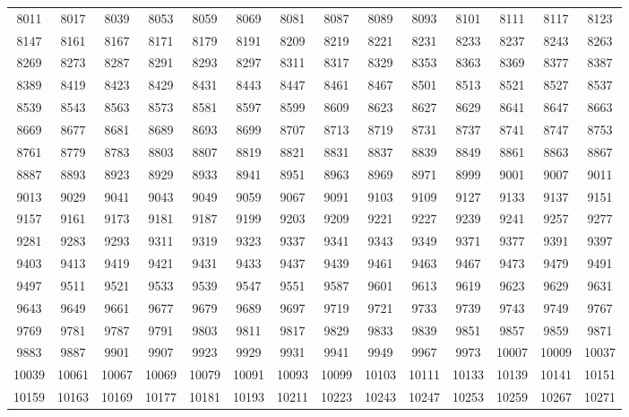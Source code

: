 \documentclass[10pt, a4paper]{article}
\begin{document}
\begin{center}
\begin{longtable}{c c c c c c c c c c c c c c}
        8011 & 8017 & 8039 & 8053 & 8059 & 8069 & 8081 & 8087 & 8089 & 8093 & 8101 & 8111 & 8117 & 8123 \\
        8147 & 8161 & 8167 & 8171 & 8179 & 8191 & 8209 & 8219 & 8221 & 8231 & 8233 & 8237 & 8243 & 8263 \\
        8269 & 8273 & 8287 & 8291 & 8293 & 8297 & 8311 & 8317 & 8329 & 8353 & 8363 & 8369 & 8377 & 8387 \\
        8389 & 8419 & 8423 & 8429 & 8431 & 8443 & 8447 & 8461 & 8467 & 8501 & 8513 & 8521 & 8527 & 8537 \\
        8539 & 8543 & 8563 & 8573 & 8581 & 8597 & 8599 & 8609 & 8623 & 8627 & 8629 & 8641 & 8647 & 8663 \\
        8669 & 8677 & 8681 & 8689 & 8693 & 8699 & 8707 & 8713 & 8719 & 8731 & 8737 & 8741 & 8747 & 8753 \\
        8761 & 8779 & 8783 & 8803 & 8807 & 8819 & 8821 & 8831 & 8837 & 8839 & 8849 & 8861 & 8863 & 8867 \\
        8887 & 8893 & 8923 & 8929 & 8933 & 8941 & 8951 & 8963 & 8969 & 8971 & 8999 & 9001 & 9007 & 9011 \\
        \hline
        9013 & 9029 & 9041 & 9043 & 9049 & 9059 & 9067 & 9091 & 9103 & 9109 & 9127 & 9133 & 9137 & 9151 \\
        9157 & 9161 & 9173 & 9181 & 9187 & 9199 & 9203 & 9209 & 9221 & 9227 & 9239 & 9241 & 9257 & 9277 \\
        9281 & 9283 & 9293 & 9311 & 9319 & 9323 & 9337 & 9341 & 9343 & 9349 & 9371 & 9377 & 9391 & 9397 \\
        9403 & 9413 & 9419 & 9421 & 9431 & 9433 & 9437 & 9439 & 9461 & 9463 & 9467 & 9473 & 9479 & 9491 \\
        9497 & 9511 & 9521 & 9533 & 9539 & 9547 & 9551 & 9587 & 9601 & 9613 & 9619 & 9623 & 9629 & 9631 \\
        9643 & 9649 & 9661 & 9677 & 9679 & 9689 & 9697 & 9719 & 9721 & 9733 & 9739 & 9743 & 9749 & 9767 \\
        9769 & 9781 & 9787 & 9791 & 9803 & 9811 & 9817 & 9829 & 9833 & 9839 & 9851 & 9857 & 9859 & 9871 \\
        9883 & 9887 & 9901 & 9907 & 9923 & 9929 & 9931 & 9941 & 9949 & 9967 & 9973 & 10007 & 10009 & 10037 \\
        10039 & 10061 & 10067 & 10069 & 10079 & 10091 & 10093 & 10099 & 10103 & 10111 & 10133 & 10139 & 10141 & 10151 \\
        10159 & 10163 & 10169 & 10177 & 10181 & 10193 & 10211 & 10223 & 10243 & 10247 & 10253 & 10259 & 10267 & 10271 \\
        \hline
    \end{longtable}
\end{center}
\end{document}

